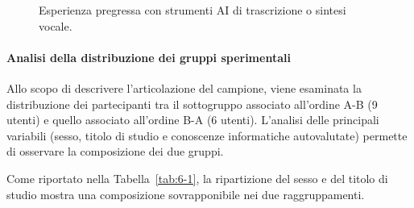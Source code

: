 \begin{figure}[H]
	\centering
	\caption{Esperienza pregressa con strumenti AI di trascrizione o sintesi vocale.}
	\label{fig:6-6}
\end{figure}

\paragraph{Analisi della distribuzione dei gruppi sperimentali}
Allo scopo di descrivere l'articolazione del campione, viene esaminata la distribuzione dei partecipanti tra il sottogruppo associato all'ordine A-B (9 utenti) e quello associato all'ordine B-A (6 utenti). L'analisi delle principali variabili (sesso, titolo di studio e conoscenze informatiche autovalutate) permette di osservare la composizione dei due gruppi.

Come riportato nella Tabella~\ref{tab:6-1}, la ripartizione del sesso e del titolo di studio mostra una composizione sovrapponibile nei due raggruppamenti.

